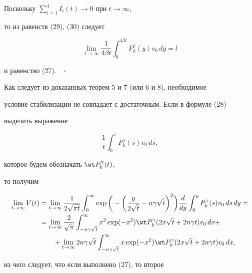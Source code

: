 




Поскольку $\sum\limits_{i=1}^4 I_i(t) \to 0$ при $t\to \infty$,


то из равенств (29), (30) следует


$$


\lim_{t\to\infty} \frac{1}{4\beta t}


\int_{0}^{4\beta t} P_k^\gamma(y) v_0\, dy=l


$$


и равенство (27).$\quad\square$


\medskip





Как следует из доказанных теорем 5 и 7 (или 6 и 8), необходимое


условие стабилизации не совпадает с достаточным. Если в формуле (28)


выделить выражение


$$


\frac{1}{t} \int_0^t P_k^\gamma(s)v_0\, ds,


$$


которое будем обозначать $\wt P_k^\gamma(t)$,


то получим


\begin{align*}


\lim_{t\to\infty}V(t)&= \lim_{t\to\infty}


\frac{1}{2\sqrt{\pi t}} \int_0^\infty


\exp\bigg (-\bigg (\frac{y}{2\sqrt{t}}-n\gamma \sqrt{t}\bigg )^2 \bigg )


\frac{d}{dy} \int_0^y P_k^\gamma(s)v_0\, ds\, dy=\\


%


&= \lim_{t\to\infty}\frac{2}{\sqrt{\pi}}


\int_{-n\gamma \sqrt{t}}^\infty x^2


\exp (-x^2 )\wt P_k^\gamma (2x\sqrt{t}+2n\gamma t )v_0\, dx+\\


%


&\qquad + \lim_{t\to\infty} 2n\gamma \sqrt{t}


\int_{-n\gamma \sqrt{t}}^\infty x


\exp (-x^2 )\wt P_k^\gamma (2x\sqrt{t}+2n\gamma t )v_0\, dx,


\end{align*}


из чего следует, что если выполнено (27), то второе


